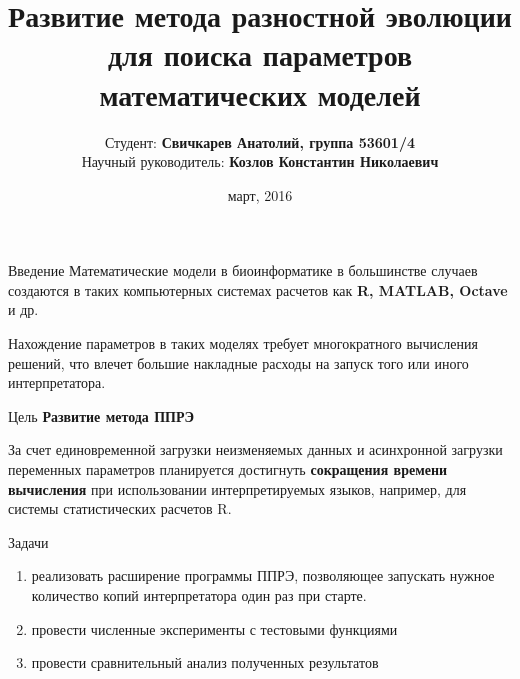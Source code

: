 \documentclass{beamer}
\begin{document}
\title[Развитие ППРЭ]
{Развитие метода разностной эволюции
для поиска параметров математических моделей}
\author[Свичкарев Анатолий]
{Студент: \textbf{Свичкарев Анатолий, группа 53601/4}\\
Научный руководитель: \textbf{Козлов Константин Николаевич}}
\date{март, 2016}

\frame{\titlepage} 

\begin{frame}{Введение}
Математические модели в биоинформатике в
большинстве случаев создаются в таких компьютерных
системах расчетов как \textbf{R, MATLAB, Octave} и др.
\bigskip

Нахождение параметров в таких моделях требует
многократного вычисления решений, что влечет
большие накладные расходы на запуск того или иного
интерпретатора.
\end{frame}

\begin{frame}{Цель}
\textbf{Развитие метода ППРЭ}

\bigskip
За счет единовременной загрузки
неизменяемых данных и
асинхронной загрузки переменных параметров
планируется достигнуть
\textbf{сокращения времени вычисления}
при использовании
интерпретируемых языков, например,
для системы статистических расчетов R.
\end{frame}

\begin{frame}{Задачи}
\begin{enumerate}
    \item реализовать расширение программы ППРЭ,
        позволяющее запускать нужное количество копий
        интерпретатора один раз при старте.
    \item провести численные эксперименты с тестовыми функциями
    \item провести сравнительный анализ полученных результатов
\end{enumerate}
\end{frame}
\end{document}
